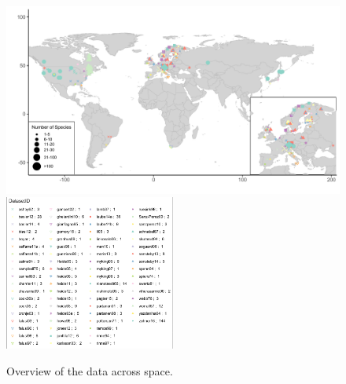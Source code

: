 \documentclass[11pt,letter]{article}
\begin{document}
\begin{figure}[t!]
\centering
\includegraphics[width=1\textwidth]{..//..//analyses/limitingcues/figures/maps/map_studyspp.pdf}
\includegraphics[width=0.5\textwidth]{..//..//analyses/limitingcues/figures/maps/map_studyspp_legend.pdf}
\caption{Overview of the data across space.}
  \label{fig:datamap} %
\end{figure}

\clearpage
\end{document}
